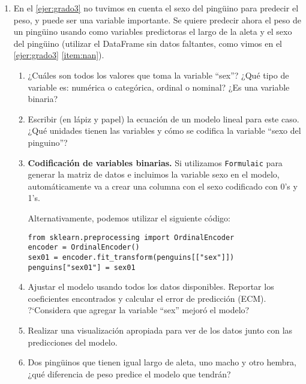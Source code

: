 \documentclass[a4paper,11pt]{article}
\theoremstyle{definition}
\begin{document}
\begin{enumerate}
\begin{enumerate}
En base a estos gr\'aficos, si quisiéramos predecir la ganancia mediante un modelo lineal utilizando una sola variable predictora, ¿cu\'al variable utilizar\'ia? Diseñar un experimento para verificar su respuesta.
\item En este ejemplo, ¿considera que un modelo lineal multivariado ayudar\'ia a predecir mejor la ganancia que el modelo lineal univariado del ítem anterior? Realizar un experimento para verificar su respuesta.
\end{enumerate}

\item En el \ref{ejer:grado3} no tuvimos en cuenta el sexo del ping\"uino para predecir el peso, y puede ser una variable importante. Se quiere predecir ahora el peso de un ping\"uino usando como variables predictoras el largo de la aleta y el sexo del ping\"uino (utilizar el DataFrame sin datos faltantes, como vimos en el \ref{ejer:grado3} \ref{item:nan}).
\begin{enumerate}
\item ¿Cu\'ales son todos los valores que toma la variable ``sex''? ¿Qu\'e tipo de variable es: numérica o categórica, ordinal o nominal? ¿Es una variable binaria?

\item Escribir (en lápiz y papel) la ecuación de un modelo lineal para este caso. ¿Qué unidades tienen las variables y cómo se codifica la variable “sexo del pinguino”?

\item \textbf{Codificación de variables binarias.} Si utilizamos \lstinline{Formulaic} para generar la matriz de datos e incluimos la variable sexo en el modelo, automáticamente va a  crear una columna con el sexo codificado con 0's y 1's.

    Alternativamente, podemos utilizar el siguiente c\'odigo:
\begin{lstlisting}
from sklearn.preprocessing import OrdinalEncoder
encoder = OrdinalEncoder()
sex01 = encoder.fit_transform(penguins[["sex"]])
penguins["sex01"] = sex01
\end{lstlisting}

\item Ajustar el modelo usando todos los datos disponibles. Reportar los coeficientes encontrados y calcular el error de predicción (ECM). ?`Considera que agregar la variable ``sex'' mejoró el modelo?
\item Realizar una visualización apropiada para ver de los datos junto con las predicciones del modelo.
\item Dos ping\"uinos que tienen igual largo de aleta, uno macho y otro hembra, ¿qué diferencia de peso predice el modelo que tendrán?
\end{enumerate}


\end{enumerate}
\end{document}
